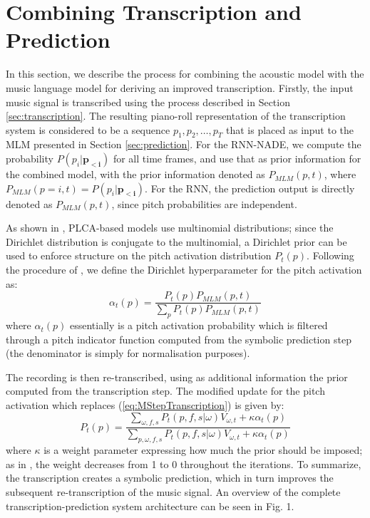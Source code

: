 \section{Combining Transcription and Prediction}
\label{sec:combination}


In this section, we describe the process for combining the acoustic model with the music language model for deriving an improved transcription. Firstly, the input music signal is transcribed using the process described in Section \ref{sec:transcription}. The resulting piano-roll representation of the transcription system is considered to be a sequence $p_1, p_2, \ldots, p_T$ that is placed as input to the MLM presented in Section \ref{sec:prediction}. For the RNN-NADE, we compute the probability $P(p_i|\mathbf{p_{<i}})$ for all time frames, and use that as prior information for the combined model, with the prior information  denoted as $P_{\mathit{MLM}}(p,t)$, where $P_{\mathit{MLM}}(p=i,t)=P(p_i|\mathbf{p_{<i}})$. For the RNN, the prediction output is directly denoted as $P_{\mathit{MLM}}(p,t)$, since pitch probabilities are independent.

As shown in \cite{Smaragdis2009}, PLCA-based models use multinomial distributions; since the Dirichlet distribution is conjugate to the multinomial, a Dirichlet prior can be used to enforce structure on the pitch activation distribution $P_{t}(p)$. Following the procedure of \cite{Smaragdis2009}, we define the Dirichlet hyperparameter for the pitch activation as:
\begin{equation}
 \alpha_{t}(p) = \frac{P_{t}(p)P_{\mathit{MLM}}(p,t)}{\sum_{p}P_{t}(p)P_{\mathit{MLM}}(p,t)}
\end{equation}
where $\alpha_{t}(p)$ essentially is a pitch activation probability which is filtered through a pitch indicator function computed from the symbolic prediction step (the denominator is simply for normalisation purposes).

The recording is then re-transcribed, using as additional information the prior computed from the transcription step. The modified update for the pitch activation which replaces (\ref{eq:MStepTranscription}) is given by:
\begin{equation}
 P_{t}(p) = \frac{\sum_{\omega,f,s}P_{t}(p,f,s|\omega)V_{\omega,t}+\kappa\alpha_{t}(p)}{\sum_{p,\omega,f,s}P_{t}(p,f,s|\omega)V_{\omega,t}+\kappa\alpha_{t}(p)} \label{eq:modifiedMStepPitchActivation}
\end{equation}
where $\kappa$ is a weight parameter expressing how much the prior should be imposed; as in \cite{Smaragdis2009}, the weight decreases from 1 to 0 throughout the iterations. To summarize, the transcription creates a symbolic prediction, which in turn improves the subsequent re-transcription of the music signal. An overview of the complete transcription-prediction system architecture can be seen in Fig. 1.

